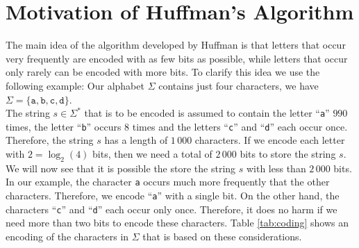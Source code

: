 \section[Motivation]{Motivation of  Huffman's Algorithm}
The main idea of the
algorithm developed by Huffman is that letters that occur very frequently are encoded with
as few bits as possible, while letters that occur only rarely can be encoded with more bits. 
To clarify this idea we use the following example:  Our alphabet $\Sigma$ contains just four characters, we have
\\[0.2cm]
\hspace*{1.3cm}
$\Sigma = \{ \mathtt{a}, \mathtt{b}, \mathtt{c}, \texttt{d} \}$. 
\\[0.2cm]
The string $s \in \Sigma^*$ that is to be encoded is assumed to contain the letter
``\texttt{a}'' $990$ times, the letter ``\texttt{b}'' occurs $8$ times and the letters ``\texttt{c}'' and
``\texttt{d}'' each occur once.  Therefore, the string $s$ has a length of $1\,000$ characters.
If we encode each letter with $2 = \log_2(4)$ bits, then we need a total of $2\,000$ bits to store the string $s$.
We will now see that it is possible the store the string $s$ with less than $2\,000$ bits.
In our example, the character \texttt{a} occurs much more frequently that the other characters.  Therefore, we
encode ``\texttt{a}'' with a single bit.  On the other hand, the characters ``\texttt{c}'' and ``\texttt{d}''
each occur only once.  Therefore, it does no harm if we need more than two bits to encode these characters.
Table \ref{tab:coding} shows an encoding of the characters in $\Sigma$ that is based on these considerations.


